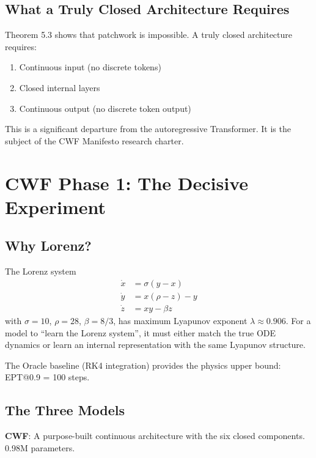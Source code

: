 \documentclass{article}
\begin{document}
\subsection{What a Truly Closed Architecture Requires}

Theorem 5.3 shows that patchwork is impossible. A truly closed architecture requires:
\begin{enumerate}
    \item Continuous input (no discrete tokens)
    \item Closed internal layers
    \item Continuous output (no discrete token output)
\end{enumerate}

This is a significant departure from the autoregressive Transformer. It is the subject of the CWF Manifesto research charter.

\section{CWF Phase 1: The Decisive Experiment}

\subsection{Why Lorenz?}

The Lorenz system
\begin{align*}
    \dot{x} &= \sigma(y - x) \\
    \dot{y} &= x(\rho - z) - y \\
    \dot{z} &= xy - \beta z
\end{align*}
with $\sigma = 10$, $\rho = 28$, $\beta = 8/3$, has maximum Lyapunov exponent $\lambda \approx 0.906$. For a model to ``learn the Lorenz system'', it must either match the true ODE dynamics or learn an internal representation with the same Lyapunov structure.

The Oracle baseline (RK4 integration) provides the physics upper bound: EPT@0.9 = 100 steps.

\subsection{The Three Models}

\textbf{CWF}: A purpose-built continuous architecture with the six closed components. 0.98M parameters.
\end{document}
